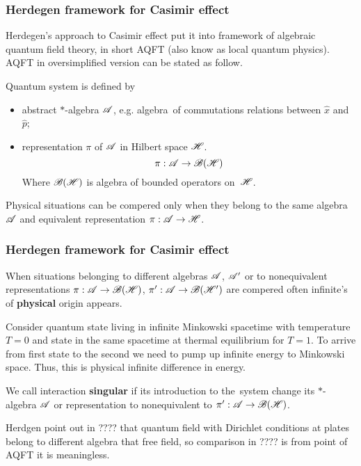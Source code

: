 \documentclass[10pt,t]{beamer}
\begin{document}
\begin{frame}
  \frametitle{Herdegen framework for Casimir effect}


  Herdegen's approach to Casimir effect put it into framework of
  algebraic quantum field theory, in short AQFT (also know as local
  quantum physics). AQFT in oversimplified version can be stated as
  follow.

  Quantum system is defined by
  \begin{itemize}

  \item abstract $*$-algebra $\mathcal{A}$, e.g. algebra~of commutations
    relations between $\widehat{x}$ and $\widehat{p}$;

  \item representation $\pi$ of $\mathcal{A}$ in Hilbert space $\mathcal{H}$.
    \begin{equation*}
      \pi: \mathcal{A} \to \mathcal{B}( \mathcal{H} )
    \end{equation*}
    Where $\mathcal{B}( \mathcal{H} )$ is algebra of \alert{bounded} operators
    on~$\mathcal{H}$.

  \end{itemize}
  Physical situations can be compered only when they belong to the
  same algebra $\mathcal{A}$ and equivalent representation $\pi: \mathcal{A} \to \mathcal{H}$.

\end{frame}





\begin{frame}
  \frametitle{Herdegen framework for Casimir effect}


  When situations belonging to different algebras $\mathcal{A}$, $\mathcal{A}'$ or to
  nonequivalent representations $\pi: \mathcal{A} \to \mathcal{B}( \mathcal{H} )$,
  $\pi': \mathcal{A} \to \mathcal{B}( \mathcal{H}' )$ are compered often infinite's of
  \textbf{physical} origin appears.

  Consider quantum state living in infinite Minkowski spacetime with
  temperature $T = 0$ and state in the same spacetime at thermal
  equilibrium for $T = 1$. To arrive from first state to the second we
  need to pump up infinite energy to Minkowski space. Thus, this is
  physical infinite difference in energy.

  We call interaction \textbf{singular} if its introduction to
  the~system change its $*$-algebra $\mathcal{A}$ or representation to
  nonequivalent to $\pi': \mathcal{A} \to \mathcal{B}( \mathcal{H} )$.

  Herdgen point out in ???? that quantum field with Dirichlet
  conditions at plates belong to different algebra that free field, so
  comparison in ???? is from point of AQFT it is meaningless.

\end{frame}
\end{document}
